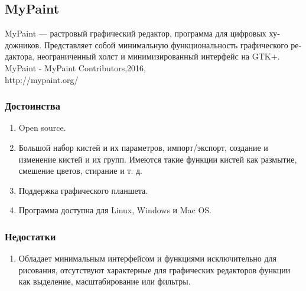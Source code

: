 \subsection{MyPaint}
MyPaint — растровый графический редактор, программа для цифровых ху­дожников. Представляет собой минимальную функциональность графического ре­дактора, неограниченный холст и минимизированный интерфейс на GTK+.\\
MyPaint - MyPaint Contributors,2016,\\
http://mypaint.org/\\


\subsubsection{Достоинства}
\begin{enumerate}
	\item Open source.
	\item Большой набор кистей и их параметров, импорт/экспорт, создание и изменение кистей и их групп. Имеются такие функции кистей как размытие, смешение цветов, стирание и т. д.
	\item Поддержка графического планшета.
	\item Программа доступна для Linux, Windows и Mac OS.
\end{enumerate}

\subsubsection{Недостатки}
\begin{enumerate}
	\item Обладает минимальным интерфейсом и функциями исключительно для рисования, отсутствуют характерные для графических редакторов функции как выделение, масштабирование или фильтры.
\end{enumerate}


